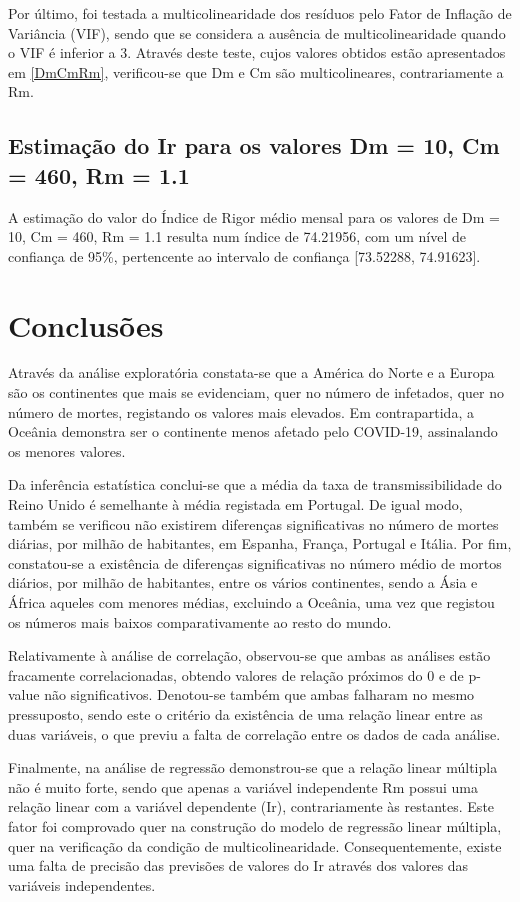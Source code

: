 \documentclass[conference]{IEEEtran}
\begin{document}
Por último, foi testada a multicolinearidade dos resíduos pelo Fator de Inflação de Variância (VIF), sendo que se considera a ausência de multicolinearidade quando o VIF é inferior a 3. Através deste teste, cujos valores obtidos estão apresentados em \eqref{DmCmRm}, verificou-se que Dm e Cm são multicolineares, contrariamente a Rm.


\subsection{Estimação do Ir para os valores Dm = 10, Cm = 460, Rm = 1.1}
A estimação do valor do Índice de Rigor médio mensal para os valores de Dm = 10, Cm = 460, Rm = 1.1 resulta num índice de 74.21956, com um nível de confiança de 95\%, pertencente ao intervalo de confiança [73.52288, 74.91623].


\section{Conclusões} %
Através da análise exploratória constata-se que a América do Norte e a Europa são os continentes que mais se evidenciam, quer no número de infetados, quer no número de mortes, registando os valores mais elevados. Em contrapartida, a Oceânia demonstra ser o continente menos afetado pelo COVID-19, assinalando os menores valores.

Da inferência estatística conclui-se que a média da taxa de transmissibilidade do Reino Unido é semelhante à média registada em Portugal. De igual modo, também se verificou não existirem diferenças significativas no número de mortes diárias, por milhão de habitantes, em Espanha, França, Portugal e Itália. Por fim, constatou-se a existência de diferenças significativas no número médio de mortos diários, por milhão de habitantes, entre os vários continentes, sendo a Ásia e África aqueles com menores médias, excluindo a Oceânia, uma vez que registou os números mais baixos comparativamente ao resto do mundo.

Relativamente à análise de correlação, observou-se que ambas as análises estão fracamente correlacionadas, obtendo valores de relação próximos do 0 e de p-value não significativos. Denotou-se também que ambas falharam no mesmo pressuposto, sendo este o critério da existência de uma relação linear entre as duas variáveis, o que previu a falta de correlação entre os dados de cada análise.

Finalmente, na análise de regressão demonstrou-se que a relação linear múltipla não é muito forte, sendo que apenas a variável independente Rm possui uma relação linear com a variável dependente (Ir), contrariamente às restantes. Este fator foi comprovado quer na construção do modelo de regressão linear múltipla, quer na verificação da condição de multicolinearidade. Consequentemente, existe uma falta de precisão das previsões de valores do Ir através dos valores das variáveis independentes.
\end{document}
